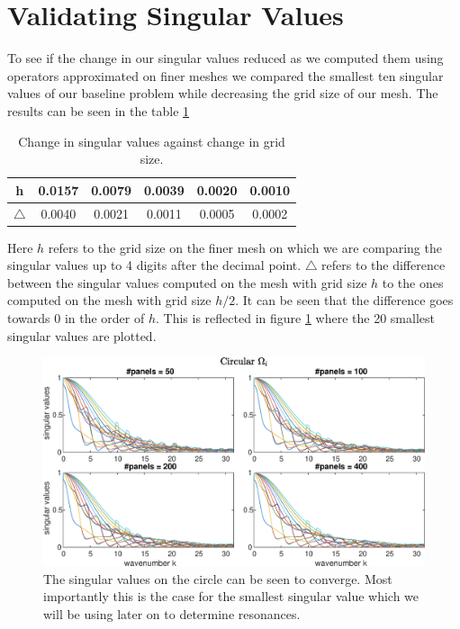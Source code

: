 \documentclass[a4paper, oneside]{thirdparty_stylesheets/discothesis}
\begin{document}
\section{Validating Singular Values} \label{sec:valsv}
To see if the change in our singular values reduced as we computed them using operators approximated on finer meshes we compared the smallest ten singular values of our baseline problem while decreasing the grid size of our mesh.
The results can be seen in the table \ref{tbl:sv}
\begin{table}[h!]
	\centering
	\begin{tabular}{ |c|c|c|c|c|c| } 
		\hline
		h & 0.0157 & 0.0079 & 0.0039 & 0.0020 & 0.0010 \\ 
		\hline
		$\bigtriangleup$ & 0.0040 & 0.0021 & 0.0011 & 0.0005 & 0.0002 \\ 
		\hline
	\end{tabular}
	\caption{Change in singular values against change in grid size.}
	\label{tbl:sv}
\end{table}
Here $h$ refers to the grid size on the finer mesh on which we are comparing the singular values up to 4 digits after the decimal point.
$\bigtriangleup$ refers to the difference between the singular values computed on the mesh with grid size $h$ to the ones computed on the mesh with grid size $h/2$.
It can be seen that the difference goes towards $0$ in the order of $h$.
This is reflected in figure \ref{fig:SVs_circle} where the 20 smallest singular values are plotted.
\begin{figure} [!ht]
	\centering
	\includegraphics[width=\columnwidth]{figures/SVs_circle.eps}
	\caption{ The singular values on the circle can be seen to converge. 
	Most importantly this is the case for the smallest singular value which we will be using later on to determine resonances.}
	\label{fig:SVs_circle}
\end{figure}
\end{document}

